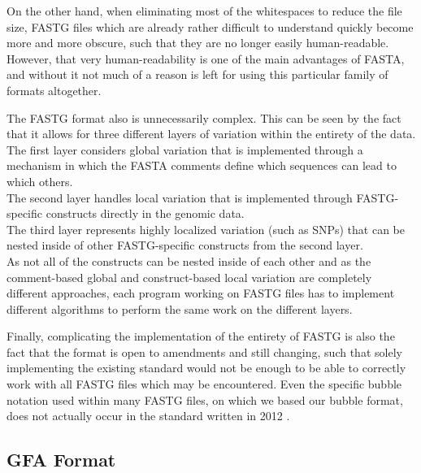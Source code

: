 \documentclass[a4paper,12pt,twoside,BCOR=10mm]{scrbook}
\begin{document}
On the other hand, when eliminating most of the whitespaces to reduce the file size,
FASTG files which are already rather difficult to understand quickly
become more and more obscure, such that they are no longer easily human-readable.
However, that very human-readability is one of the main advantages of FASTA,
and without it not much of a reason is left for using this particular family
of formats altogether.

The FASTG format also is unnecessarily complex. This can be seen by the fact that
it allows for three different layers of variation within the entirety of the data. \\
The first layer considers global variation that is implemented through a mechanism in which the
FASTA comments define which sequences can lead to which others. \\
The second layer handles local variation that is implemented through FASTG-specific constructs
directly in the genomic data. \\
The third layer represents highly localized variation (such as SNPs) that can be nested
inside of other FASTG-specific constructs from the second layer. \\
As not all of the constructs can be nested inside of each other
and as the comment-based global and construct-based local
variation are completely different approaches, each program working on FASTG files
has to implement different algorithms to perform the same work on the different layers.

Finally, complicating the implementation of the entirety of FASTG
is also the fact that the format is open to amendments and still changing,
such that solely implementing the existing standard would not be enough
to be able to correctly work with all FASTG files which may be encountered.
Even the specific bubble notation used within many FASTG files,
on which we based our bubble format,
does not actually occur in the standard written in 2012 \citep{specGFA1,specFASTG}.

\subsection{GFA Format}
\end{document}
